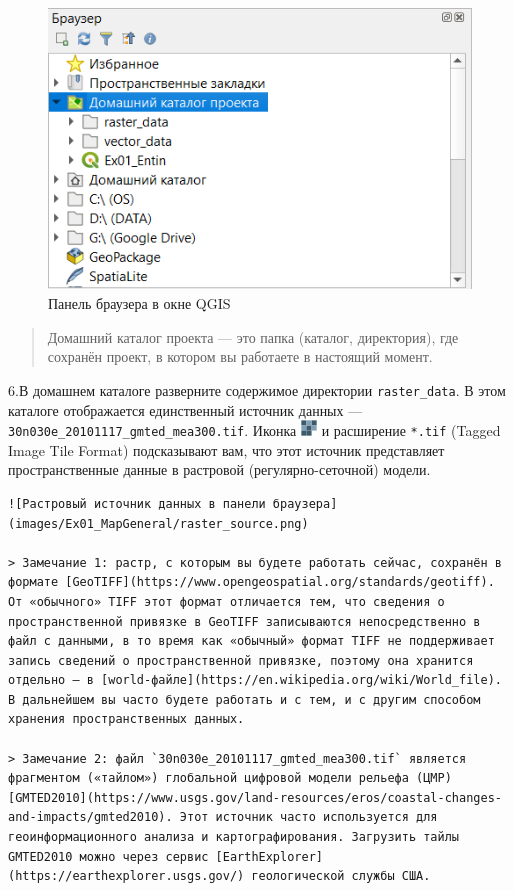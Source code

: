 \documentclass[
  12pt,
]{book}
\begin{document}
\begin{enumerate}
  \begin{figure}
  \centering
  \includegraphics{images/Ex01_MapGeneral/browser_panel.png}
  \caption{Панель браузера в окне QGIS}
  \end{figure}

  \begin{quote}
  Домашний каталог проекта --- это папка (каталог, директория), где сохранён проект, в котором вы работаете в настоящий момент.
  \end{quote}
\end{enumerate}

6.В домашнем каталоге разверните содержимое директории \texttt{raster\_data}. В этом каталоге отображается единственный источник данных --- \texttt{30n030e\_20101117\_gmted\_mea300.tif}. Иконка \includegraphics{images/Ex01_MapGeneral/raster.png} и расширение \texttt{*.tif} (Tagged Image Tile Format) подсказывают вам, что этот источник представляет пространственные данные в растровой (регулярно-сеточной) модели.

\begin{verbatim}
![Растровый источник данных в панели браузера](images/Ex01_MapGeneral/raster_source.png)

> Замечание 1: растр, с которым вы будете работать сейчас, сохранён в формате [GeoTIFF](https://www.opengeospatial.org/standards/geotiff). От «обычного» TIFF этот формат отличается тем, что сведения о пространственной привязке в GeoTIFF записываются непосредственно в файл с данными, в то время как «обычный» формат TIFF не поддерживает запись сведений о пространственной привязке, поэтому она хранится отдельно — в [world-файле](https://en.wikipedia.org/wiki/World_file). В дальнейшем вы часто будете работать и с тем, и с другим способом хранения пространственных данных.

> Замечание 2: файл `30n030e_20101117_gmted_mea300.tif` является фрагментом («тайлом») глобальной цифровой модели рельефа (ЦМР) [GMTED2010](https://www.usgs.gov/land-resources/eros/coastal-changes-and-impacts/gmted2010). Этот источник часто используется для геоинформационного анализа и картографирования. Загрузить тайлы GMTED2010 можно через сервис [EarthExplorer](https://earthexplorer.usgs.gov/) геологической службы США.
\end{verbatim}
\end{document}

